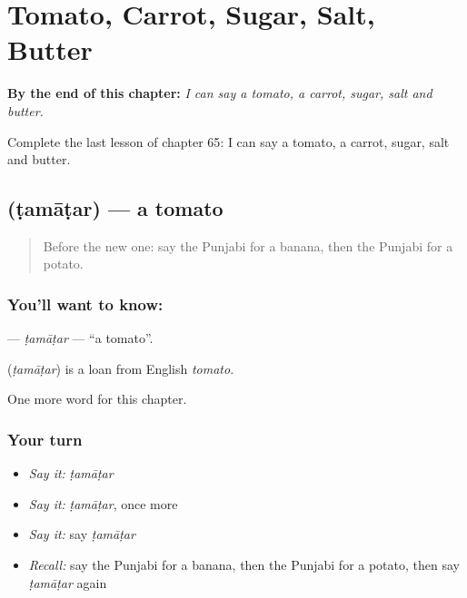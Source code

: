 
\chapter{Tomato, Carrot, Sugar, Salt, Butter}
\label{ch:pa-tomato-carrot-sugar-salt-butter}

\begin{chapteropening}
\textbf{By the end of this chapter:} \emph{I can say a tomato, a carrot, sugar, salt and butter.}

Complete the last lesson of chapter 65: I can say a tomato, a carrot, sugar, salt and butter.
\end{chapteropening}

\section[\texorpdfstring{\pa{ਟਮਾਟਰ} (ṭamāṭar)}{ਟਮਾਟਰ (ṭamāṭar)}]{ (ṭamāṭar) — a tomato}

\label{lesson:PA-C65-tamatar}



\begin{quote}
Before the new one: say the Punjabi for a banana, then the Punjabi for a potato.
\end{quote}

\subsection*{You'll want to know: }
\textbf{} — \emph{ṭamāṭar} — \textquotedblleft{}a tomato\textquotedblright{}.

\begin{cousinweb}
\textbf{} (\emph{ṭamāṭar}) is a loan from English \emph{tomato}.
\end{cousinweb}

\begin{grammarlens}[title={What you've built}]
One more word for this chapter.
\end{grammarlens}

\subsection*{Your turn}
\begin{itemize}
\raggedright
  \item \emph{Say it:} \emph{ṭamāṭar}
  \item \emph{Say it:} \emph{ṭamāṭar}, once more
  \item \emph{Say it:} say \emph{ṭamāṭar}
  \item \emph{Recall:} say the Punjabi for a banana, then the Punjabi for a potato, then say \emph{ṭamāṭar} again
\end{itemize}

